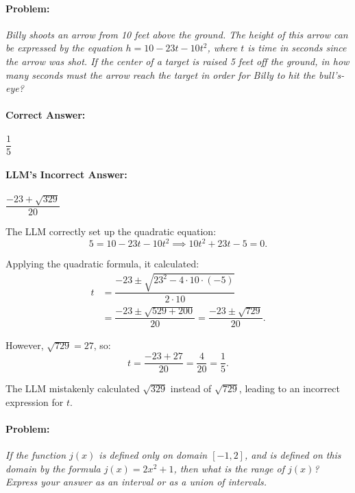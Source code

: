 \documentclass[11pt,a4paper]{article}
\begin{document}
\paragraph{Problem:} \textit{Billy shoots an arrow from 10 feet above the ground. The height of this arrow can be expressed by the equation \( h = 10 - 23t - 10t^2 \), where \( t \) is time in seconds since the arrow was shot. If the center of a target is raised 5 feet off the ground, in how many seconds must the arrow reach the target in order for Billy to hit the bull's-eye?}

\paragraph{Correct Answer:} \( \dfrac{1}{5} \)

\paragraph{LLM's Incorrect Answer:} \( \dfrac{-23 + \sqrt{329}}{20} \)

\begin{tcolorbox}[colback=gray!10, colframe=black, title=\textbf{Step-by-Step Analysis}, fonttitle=\bfseries]
\footnotesize
The LLM correctly set up the quadratic equation:
\[
5 = 10 - 23t - 10t^2 \implies 10t^2 + 23t - 5 = 0.
\]

Applying the quadratic formula, it calculated:
\begin{align*}
t &= \dfrac{-23 \pm \sqrt{23^2 - 4 \cdot 10 \cdot (-5)}}{2 \cdot 10} \\
&= \dfrac{-23 \pm \sqrt{529 + 200}}{20} = \dfrac{-23 \pm \sqrt{729}}{20}.
\end{align*}

However, \( \sqrt{729} = 27 \), so:
\[
t = \dfrac{-23 + 27}{20} = \dfrac{4}{20} = \dfrac{1}{5}.
\]

The LLM mistakenly calculated \( \sqrt{329} \) instead of \( \sqrt{729} \), leading to an incorrect expression for \( t \).
\end{tcolorbox}

\paragraph{Problem:} \textit{If the function \( j(x) \) is defined only on domain \( [-1, 2] \), and is defined on this domain by the formula \( j(x) = 2x^2 + 1 \), then what is the range of \( j(x) \)? Express your answer as an interval or as a union of intervals.}
\end{document}
